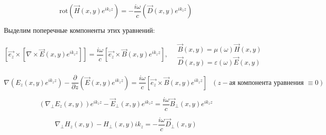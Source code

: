 \documentclass[12pt, a4paper]{report}
\begin{document}
\[ \mathrm{rot } (\vec{H } (x,y )e^{i k_z z}) = -\frac{i \omega }{c } ( \vec{D} (x,y ) e^{ i k_z z} )  \] 

Выделим поперечные компоненты этих уравнений: 

\[[ \vec{e_{z} } \times [ \nabla \times  \vec{E } (x,y ) e^{i k_z z} ]] = \frac{i \omega }{c } [ \vec{e_z } \times  \vec{B } (x,y) e^{ i k_z z}  ]  , \quad  \begin{aligned}
    \vec{B } (x,y ) = \mu(\omega ) \vec{H}(x,y ) \\ 
    \vec{D} (x,y ) = \varepsilon(\omega ) \vec{E}(x,y )
\end{aligned}    \] 

\[ \nabla (E_z (x,y ) e^{ i k_z z } ) - \frac{\partial}{\partial z} (\vec{E } (x,y )e^{i k_z z} ) = \frac{i \omega }{c } [\vec{e_z} \times \vec{B } (x,y ) e^{ i k_z z} ]\text{  }  (z-\text{ая компонента уравнения } \equiv 0)  \] 

\[ (\nabla_{\perp } E_z (x,y ) ) e^{i k_z z} - \vec{E } _{ \perp } (x,y ) e^{i k_z z} =  \frac{i \omega }{c } \vec{B} _{ \perp } (x,y )    e^{ i k_z z}      \] 

\[ \nabla_{ \perp } H_z (x,y )- H_{ \perp } (x,y ) i k_z = - \frac{ i\omega }{c } \vec{D } _{\perp  } (x,y)  \]  


\ifdefined\mainfile
\else
    
\end{document}
